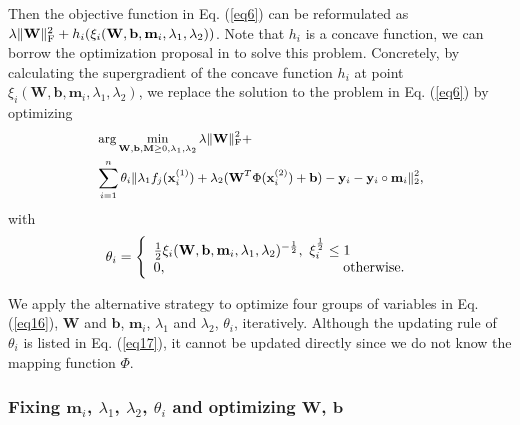 \documentclass[10pt,journal,compsoc]{IEEEtran}
\begin{document}
Then the objective function in Eq. (\ref{eq6}) can be reformulated as $\lambda \|\mathbf{W}\|_{\rm{F}}^{2} + h_i(\xi_i(\mathbf{W},\mathbf{b}, \mathbf{m}_i, \lambda_1, \lambda_2))$. Note that $h_i$ is a concave function, we can borrow the optimization proposal in \cite{NieWH17} to solve this problem. Concretely, by calculating the supergradient of the concave function $h_i$ at point $\xi_i(\mathbf{W}, \mathbf{b}, \mathbf{m}_i, \lambda_1, \lambda_2)$, we replace the solution to the problem in Eq. (\ref{eq6}) by optimizing
\begin{equation}
\label{eq16}
\small{
\begin{split}
& \arg \min_{\mathbf{W},\mathbf{b}, \mathbf{M} \geq 0, \lambda_1,\lambda_2} \lambda \|\mathbf{W}\|_{\rm{F}}^{2} +  \\
& \sum_{i=1}^n \theta _i \| \lambda_1 f_j(\mathbf{x}_i^{(1)})+\lambda_2 (\mathbf{W}^T \Phi(\mathbf{x}_i^{(2)})+\mathbf{b}) - \mathbf{y}_i-\mathbf{y}_i \circ \mathbf{m}_i\|_2^2,
\end{split}}
\end{equation}
with
\begin{equation}
\label{eq17}
\theta_i = \left\{
{\begin{array}{*{20}{l}}
{\frac{1}{2} \xi_i(\mathbf{W},\mathbf{b}, \mathbf{m}_i, \lambda_1,\lambda_2)^{-\frac{1}{2}},~\xi_i^{\frac{1}{2}} \leq 1}\\
{0,~~~~~~~~~~~~~~~~~~~~~~~~~~~~~~~~~~~~~~\rm{otherwise}}.
\end{array}} \right.
\end{equation}

We apply the alternative strategy to optimize four groups of variables in Eq. (\ref{eq16}), $\mathbf{W}$ and $\mathbf{b}$, $\mathbf{m}_i$, $\lambda_1$ and $\lambda_2$, $\theta_i$, iteratively. Although the updating rule of $\theta_i$ is listed in Eq. (\ref{eq17}), it cannot be updated directly since we do not know the mapping function $\Phi$.

\subsubsection{Fixing $\mathbf{m}_i$, $\lambda_1$, $\lambda_2$, $\theta_i$ and optimizing $\mathbf{W}$, $\mathbf{b}$}
\end{document}
